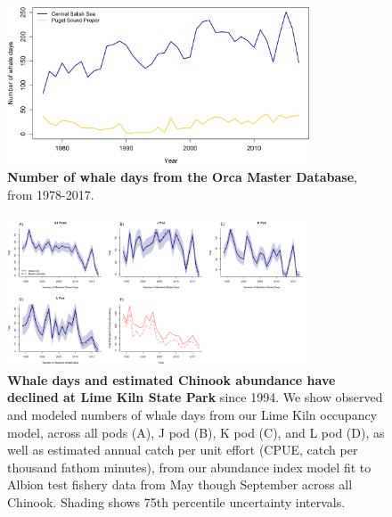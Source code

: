 \documentclass{article}
\begin{document}
\begin{figure}[ht]
\includegraphics[width=0.8\textwidth]{../analyses/figures/OrcaPhenPlots/whaledays_assumeSRKW2regs.png} 
\caption{\textbf{Number of whale days from the Orca Master Database}, from 1978-2017. }
\label{fig:wdays}
\end{figure}


\begin{figure}[ht]
\includegraphics[width=0.8\textwidth]{../analyses/orcaphen/figures/modwhaledays_lime.png} 
\caption{\textbf{Whale days and estimated Chinook abundance have declined at Lime Kiln State Park} since 1994. We show observed and modeled numbers of whale days from our Lime Kiln occupancy model, across all pods (A), J pod (B), K pod (C), and L pod (D), as well as estimated annual catch per unit effort (CPUE, catch per thousand fathom minutes), from our abundance index model fit to Albion test fishery data from May though September across all Chinook. Shading shows 75th percentile uncertainty intervals.}
\label{fig:mlimewdays}
 \end{figure}
 
\end{document}
